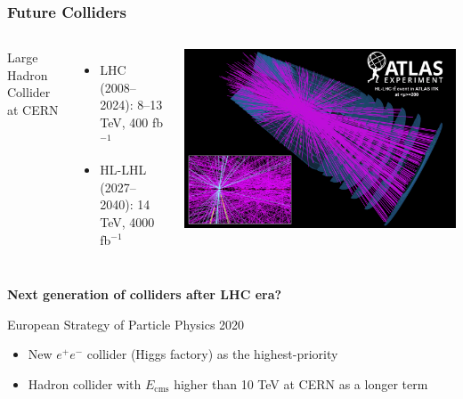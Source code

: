 \documentclass[aspectratio=169]{beamer}
\newcommand{\bluetext}[1]{%
  \textcolor{myBlue}{#1}
}
\begin{document}
\begin{frame}
  \frametitle{Future Colliders}

  \begin{columns}[c]

    \bluetext{Large Hadron Collider at CERN}
    \begin{itemize}
    \item LHC (2008--2024): 8--13 TeV, 400 fb$^{-1}$
    \item HL-LHL (2027--2040): 14 TeV, 4000 fb$^{-1}$
    \end{itemize}


    \begin{center}
      \includegraphics[width=0.75\linewidth]{figures/HL-LHC-tt.png} \\
    \end{center}
  \end{columns}
  \pause%

  \vspace{2ex}
  \bluetext{{\bf Next generation of colliders after LHC era?}} \\
  \vspace{2ex}
  \pause%

  \bluetext{European Strategy of Particle Physics 2020} \\
  \begin{itemize}
    \item New $e^+e^-$ collider (Higgs factory) as the highest-priority
    \item Hadron collider with $E_{\mathrm{cms}}$ higher than 10 TeV at CERN as
          a longer term
  \end{itemize}
\end{frame}
\end{document}
